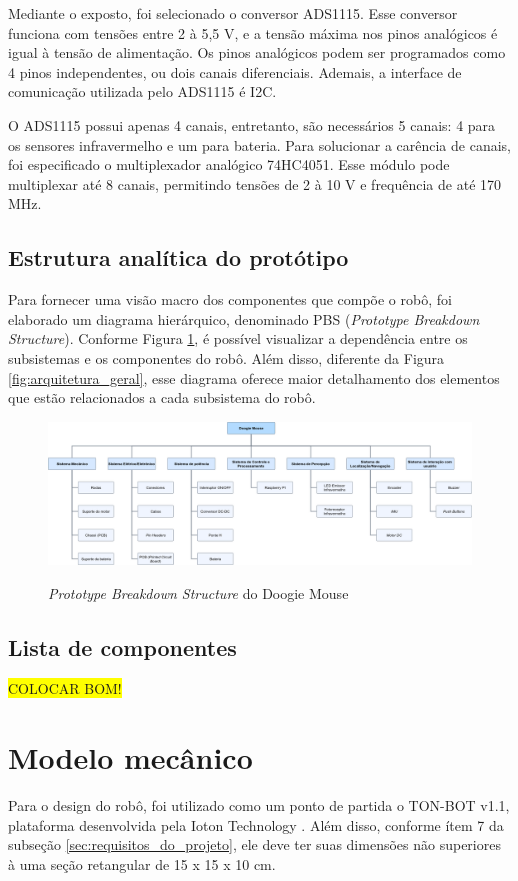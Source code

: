 Mediante o exposto, foi selecionado o conversor ADS1115. Esse conversor funciona com tensões entre 2 à 5,5 V, e a tensão máxima nos pinos analógicos é igual à tensão de alimentação. Os pinos analógicos podem ser programados como 4 pinos independentes, ou dois canais diferenciais. Ademais, a interface de comunicação utilizada pelo ADS1115 é I2C.

O ADS1115 possui apenas 4 canais, entretanto, são necessários 5 canais: 4 para os sensores infravermelho e um para bateria. Para solucionar a carência de canais, foi especificado o multiplexador analógico 74HC4051. Esse módulo pode multiplexar até 8 canais, permitindo tensões de 2 à 10 V e frequência de até 170 MHz.

\subsection{Estrutura analítica do protótipo}
\label{ssec:pbs}
Para fornecer uma visão macro dos componentes que compõe o robô, foi elaborado um diagrama hierárquico, denominado PBS (\textit{Prototype Breakdown Structure}). Conforme Figura \ref{fig:pbs}, é possível visualizar a dependência entre os subsistemas e os componentes do robô. Além disso, diferente da Figura \ref{fig:arquitetura_geral}, esse diagrama oferece maior detalhamento dos elementos que estão relacionados a cada subsistema do robô.

\begin{figure}[H]
	\centering
	\caption{\textit{Prototype Breakdown Structure} do Doogie Mouse}
	\includegraphics[width=1\textwidth]
	{Figures/prototype_breakdown_structure}
	\label{fig:pbs}
\end{figure}

\subsection{Lista de componentes}
\label{ssec:bom}
\colorbox{yellow}{COLOCAR BOM!}


\section{Modelo mecânico}
\label{sec:modelo_mecanico}
Para o design do robô, foi utilizado como um ponto de partida o TON-BOT v1.1, plataforma desenvolvida pela Ioton Technology \cite{teste}. Além disso, conforme ítem 7 da subseção \ref{sec:requisitos_do_projeto}, ele deve ter suas dimensões não superiores à uma seção retangular de 15 x 15 x 10 cm.

